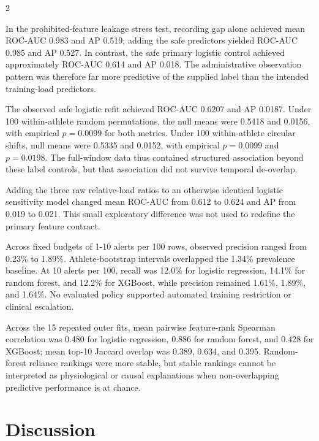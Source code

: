 \documentclass[11pt,a4paper]{article}
\begin{document}
\begin{multicols}{2}

In the prohibited-feature leakage stress test, recording gap alone achieved mean ROC-AUC 0.983 and AP 0.519; adding the safe predictors yielded ROC-AUC 0.985 and AP 0.527. In contrast, the safe primary logistic control achieved approximately ROC-AUC 0.614 and AP 0.018. The administrative observation pattern was therefore far more predictive of the supplied label than the intended training-load predictors.

The observed safe logistic refit achieved ROC-AUC 0.6207 and AP 0.0187. Under 100 within-athlete random permutations, the null means were 0.5418 and 0.0156, with empirical $p=0.0099$ for both metrics. Under 100 within-athlete circular shifts, null means were 0.5335 and 0.0152, with empirical $p=0.0099$ and $p=0.0198$. The full-window data thus contained structured association beyond these label controls, but that association did not survive temporal de-overlap.

Adding the three raw relative-load ratios to an otherwise identical logistic sensitivity model changed mean ROC-AUC from 0.612 to 0.624 and AP from 0.019 to 0.021. This small exploratory difference was not used to redefine the primary feature contract.

Across fixed budgets of 1-10 alerts per 100 rows, observed precision ranged from 0.23\% to 1.89\%. Athlete-bootstrap intervals overlapped the 1.34\% prevalence baseline. At 10 alerts per 100, recall was 12.0\% for logistic regression, 14.1\% for random forest, and 12.2\% for XGBoost, while precision remained 1.61\%, 1.89\%, and 1.64\%. No evaluated policy supported automated training restriction or clinical escalation.

Across the 15 repeated outer fits, mean pairwise feature-rank Spearman correlation was 0.480 for logistic regression, 0.886 for random forest, and 0.428 for XGBoost; mean top-10 Jaccard overlap was 0.389, 0.634, and 0.395. Random-forest reliance rankings were more stable, but stable rankings cannot be interpreted as physiological or causal explanations when non-overlapping predictive performance is at chance.

\section{Discussion}


\end{multicols}
\end{document}
